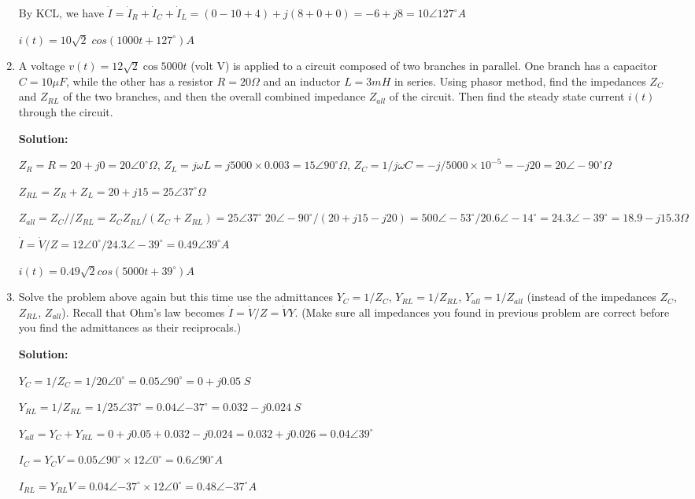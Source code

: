 \begin{enumerate}
By KCL, we have $\dot{I}=\dot{I}_R+\dot{I}_C+\dot{I}_L=(0-10+4)+j(8+0+0)
  	=-6+j8=10\angle{127^\circ} A$

  $i(t)=10\sqrt{2}\;cos(1000t+127^\circ) A$

\item A voltage $v(t)=12\sqrt{2} \cos 5000 t$ (volt V) is applied to a circuit
composed of two branches in parallel. One branch has a capacitor $C=10\mu F$,
while the other has a resistor $R=20\Omega$ and an inductor $L=3 mH$ in series.
Using phasor method, find the impedances $Z_C$ and $Z_{RL}$ of the two branches,
and then the overall combined impedance $Z_{all}$ of the circuit. Then find
the steady state current $i(t)$ through the circuit.

{\bf Solution:}

$Z_R=R=20+j0=20\angle 0^\circ \Omega$, $Z_L=j\omega L=j5000\times 0.003
=15\angle 90^\circ \Omega$, $Z_C=1/j\omega C=-j/5000 \times 10^{-5}=-j20
=20\angle -90^\circ \Omega$

$Z_{RL}=Z_R+Z_L=20+j15=25\angle 37^\circ \Omega$

$Z_{all}=Z_C//Z_{RL}=Z_C Z_{RL}/(Z_C+Z_{RL})=25\angle 37^\circ \; 
20\angle -90^\circ/(20+j15-j20)=500\angle -53^\circ/20.6\angle -14^\circ
=24.3\angle -39^\circ=18.9-j15.3 \Omega $

$\dot{I}=\dot{V}/{Z}=12\angle 0^\circ/24.3\angle -39^\circ=0.49\angle 39^\circ A$

  $i(t)=0.49\sqrt{2} cos(5000t+39^\circ) A$

\item Solve the problem above again but this time use the admittances 
$Y_C=1/Z_C$, $Y_{RL}=1/Z_{RL}$, $Y_{all}=1/Z_{all}$ (instead of the
impedances $Z_C$, $Z_{RL}$, $Z_{all}$). Recall that Ohm's law becomes
$\dot{I}=\dot{V}/Z=\dot{V}Y$. (Make sure all impedances you found in 
previous problem are correct before you find the admittances as their 
reciprocals.)

{\bf Solution:}

$Y_C=1/Z_C=1/20\angle{0^\circ}=0.05\angle{90^\circ}=0+j0.05\;S$

$Y_{RL}=1/Z_{RL}=1/25\angle{37^\circ}=0.04\angle{-37^\circ}=0.032-j0.024\;S$

$Y_{all}=Y_C+Y_{RL}=0+j0.05 + 0.032-j0.024=0.032+j0.026=0.04\angle{39^\circ}$

$I_C=Y_C V=0.05\angle{90^\circ} \times 12\angle{0^\circ}=0.6\angle{90^\circ}A$

$I_{RL}=Y_{RL} V=0.04\angle{-37^\circ} \times 12\angle{0^\circ}=0.48\angle{-37^\circ}A$


\end{enumerate}

